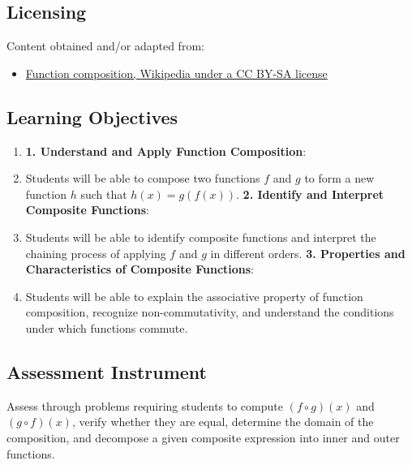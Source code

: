 \subsection{Licensing}
\label{sss:lice-7352}

Content obtained and/or adapted from:

\begin{itemize}
    \item \href{https://en.wikipedia.org/wiki/Function_composition}{Function composition, Wikipedia under a CC BY-SA license}
\end{itemize}

\subsection{Learning Objectives}
\label{ssec:lear-9e9f}

\begin{enumerate}
    \item \textbf{1. Understand and Apply Function Composition}:
    \item Students will be able to compose two functions $f$ and $g$ to form a new function $h$ such that $h(x) = g(f(x))$. \textbf{2. Identify and Interpret Composite Functions}:
    \item Students will be able to identify composite functions and interpret the chaining process of applying $f$ and $g$ in different orders. \textbf{3. Properties and Characteristics of Composite Functions}:
    \item Students will be able to explain the associative property of function composition, recognize non-commutativity, and understand the conditions under which functions commute.
\end{enumerate}

\subsection{Assessment Instrument}
\label{ssec:asse-c630}

Assess through problems requiring students to compute $(f \circ g)(x)$ and $(g \circ
f)(x)$, verify whether they are equal, determine the domain of the composition, and
decompose a given composite expression into inner and outer functions.

